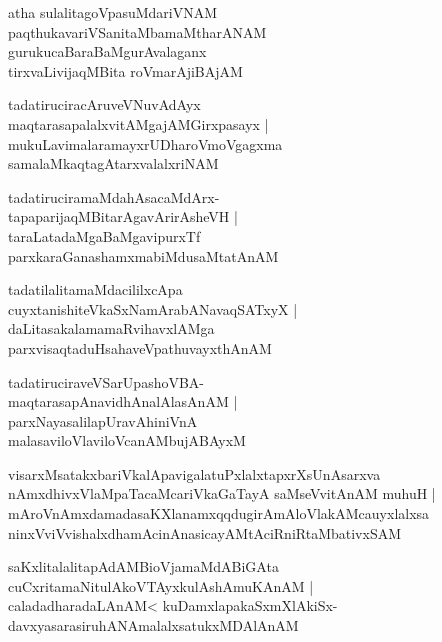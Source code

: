 \documentclass[twoside,12pt,openright]{book}
\newcounter{shloka}[chapter]
\begin{document}
\begin{shloka}%
atha sulalitagoVpasuMdariVNAM \\
paqthukavariVSanitaMbamaMtharANAM \\
gurukucaBaraBaMgurAvalaganx \\
tirxvaLivijaqMBita roVmarAjiBAjAM 
\end{shloka}

\begin{shloka}%
tadatiruciracAruveVNuvAdAyx \\
maqtarasapalalxvitAMgajAMGirxpasayx |\\
mukuLavimalaramayxrUDharoVmoVgagxma \\
samalaMkaqtagAtarxvalalxriNAM 
\end{shloka}

\begin{shloka}%
tadatiruciramaMdahAsacaMdArx-\\
tapaparijaqMBitarAgavArirAsheVH |\\
taraLatadaMgaBaMgavipurxTf \\
parxkaraGanashamxmabiMdusaMtatAnAM 
\end{shloka}

\begin{shloka}%
tadatilalitamaMdacililxcApa \\
cuyxtanishiteVkaSxNamArabANavaqSATxyX |\\
daLitasakalamamaRvihavxlAMga \\
parxvisaqtaduHsahaveVpathuvayxthAnAM 
\end{shloka}

\begin{shloka}%
tadatiruciraveVSarUpashoVBA-\\
maqtarasapAnavidhAnalAlasAnAM |\\
parxNayasalilapUravAhiniVnA \\
malasaviloVlaviloVcanAMbujABAyxM 
\end{shloka}

\begin{shloka}%
visarxMsatakxbariVkalApavigalatuPxlalxtapxrXsUnAsarxva \\
nAmxdhivxVlaMpaTacaMcariVkaGaTayA saMseVvitAnAM muhuH |\\
mAroVnAmxdamadasaKXlanamxqqdugirAmAloVlakAMcauyxlalxsa \\
ninxVviVvishalxdhamAcinAnasicayAMtAciRniRtaMbativxSAM
\end{shloka}

\begin{shloka}%
saKxlitalalitapAdAMBioVjamaMdABiGAta\\
cuCxritamaNitulAkoVTAyxkulAshAmuKAnAM |\\
caladadharadaLAnAM< kuDamxlapakaSxmXlAkiSx-\\
davxyasarasiruhANAmalalxsatukxMDAlAnAM 
\end{shloka}
\end{document}
